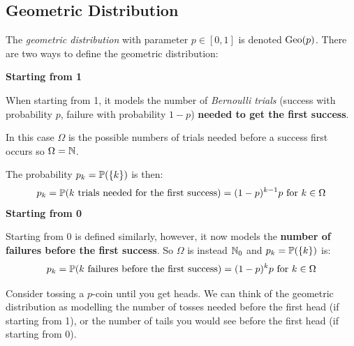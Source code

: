 \documentclass[../main.tex]{subfiles}
\begin{document}
\subsection{Geometric Distribution}
\label{geometricDist}
\begin{definition}
  The \textit{geometric distribution} with parameter $p \in [0, 1]$ is denoted $\geometric(p)$.
  There are two ways to define the geometric distribution:

  \textbf{Starting from 1}\par
    When starting from 1, it models the number of \textit{Bernoulli trials} (success with probability $p$, failure with probability $1 - p$) \textbf{needed to get the first success}.

    In this case $\Omega$ is the possible numbers of trials needed before a success first occurs so $\Omega = \N$.

    The probability $p_k = \P(\{k\})$ is then:
    \[
      p_k = \P(\text{$k$ trials needed for the first success}) = (1-p)^{k - 1}p \text{ for } k \in \Omega
    \]
  \textbf{Starting from 0}\par
    Starting from 0 is defined similarly, however, it now models the \textbf{number of failures before the first success}.
    So $\Omega$ is instead $\N_0$ and $p_k = \P(\{k\})$ is:
    \[
      p_k = \P(\text{$k$ failures before the first success}) = (1-p)^{k}p \text{ for } k \in \Omega
    \]
\end{definition}
\begin{remark}[Intuition]
  Consider tossing a $p$-coin until you get heads.
  We can think of the geometric distribution as modelling the number of tosses needed before the first head (if starting from 1), or the number of tails you would see before the first head (if starting from 0).
\end{remark}
\end{document}
